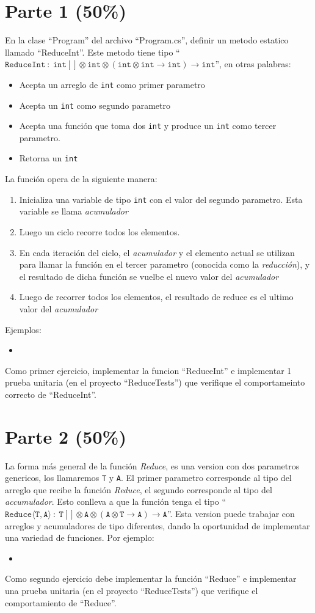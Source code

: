 \documentclass{article}
\newcommand{\perlscript}[2]{
\begin{itemize}
\item[]
\end{itemize}
}
\begin{document}
\section*{Parte 1 (50\%)}
En la clase ``Program'' del archivo ``Program.cs'', definir un
metodo estatico llamado ``ReduceInt''. Este metodo tiene tipo
``$\mathtt{ReduceInt}\ :\ \mathtt{int[]}\otimes\mathtt{int}\otimes
(\mathtt{int}\otimes\mathtt{int}\rightarrow\mathtt{int})\rightarrow\mathtt{int}$'',
en otras palabras:
\begin{itemize}
        \item{Acepta un arreglo de \texttt{int} como primer parametro}
        \item{Acepta un \texttt{int} como segundo parametro}
        \item{Acepta una funci\'on que toma dos \texttt{int} y produce un \texttt{int}
        como tercer parametro.}
        \item{Retorna un \texttt{int}}
\end{itemize}
La funci\'on opera de la siguiente manera:
\begin{enumerate}
        \item{Inicializa una variable de tipo \texttt{int} con el
        valor del segundo parametro. Esta variable se llama \emph{acumulador}}
        \item{Luego un ciclo recorre todos los elementos.}
        \item{En cada iteraci\'on del ciclo, el \emph{acumulador} y el
        elemento actual se utilizan para llamar la funci\'on en el tercer
        parametro (conocida como la \emph{reducci\'on}), y el resultado de
        dicha funci\'on se vuelbe el nuevo valor del \emph{acumulador}}
        \item{Luego de recorrer todos los elementos, el resultado de
        reduce es el ultimo valor del \emph{acumulador}}
\end{enumerate}
Ejemplos:
\perlscript{./ReduceInt}{}
Como primer ejercicio, implementar la funcion ``ReduceInt'' e
implementar 1 prueba unitaria (en el proyecto ``ReduceTests'')
que verifique el comportameinto correcto de ``ReduceInt''.
\pagebreak
\section*{Parte 2 (50\%)}
La forma m\'as general de la funci\'on \emph{Reduce}, es una version
con dos parametros genericos, los llamaremos \texttt{T} y \texttt{A}.
El primer parametro corresponde al tipo del arreglo que recibe la
funci\'on \emph{Reduce}, el segundo corresponde al tipo del \emph{accumulador}.
Esto conlleva a que la funci\'on tenga el tipo ``$\mathtt{Reduce}\langle\mathtt{T},
\mathtt{A}\rangle\ :\ \mathtt{T}[]\otimes\mathtt{A}\otimes(\mathtt{A}\otimes\mathtt{T}
\rightarrow\mathtt{A})\rightarrow\mathtt{A}$''. Esta version puede
trabajar con arreglos y acumuladores de tipo diferentes, dando la
oportunidad de implementar una variedad de funciones. Por ejemplo:
\perlscript{./Reduce}{}
Como segundo ejercicio debe implementar la funci\'on ``Reduce'' e
implementar una prueba unitaria (en el proyecto ``ReduceTests'')
que verifique el comportamiento de ``Reduce''.
\end{document}
